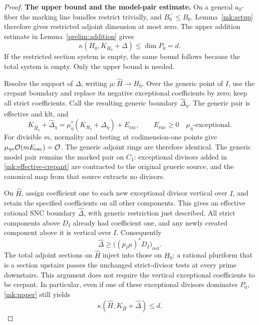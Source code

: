 \begin{proof}
\smallskip\noindent\textbf{The upper bound and the model-pair estimate.}\enspace
On a general $a_0$-fiber the marking line bundles restrict trivially,
and $B_0^-\leq B_0$.  Lemma~\ref{mk:setup} therefore gives restricted
adjoint dimension at most zero.  The upper addition estimate
in Lemma~\ref{prelim:addition} gives
\begin{equation}\label{mk:upper}
 \kappa(H_0,K_{H_0}+\Delta)\leq\dim P_0=d.
\end{equation}
If the restricted section system is empty, the same bound follows
because the total system is empty.  Only the upper bound is needed.

Resolve the support of $\Delta$, writing
$\mu:\widehat H\to H_0$.  Over the generic point of $I$, use the
crepant boundary and replace its negative exceptional coefficients by
zero; keep all strict coefficients.  Call the resulting generic
boundary $\widehat\Delta_\eta$.  The generic pair is effective and klt,
and
\begin{equation}\label{mk:effective-crepant}
 K_{\widehat H_\eta}+\widehat\Delta_\eta
 =\mu_\eta^*(K_{H_\eta}+\Delta_\eta)+E_{\mathrm{exc}},
 \qquad E_{\mathrm{exc}}\geq0
 \quad\text{$\mu_\eta$-exceptional}.
\end{equation}
For divisible $m$, normality and testing at codimension-one points give
$\mu_{\eta*}\mathcal O(mE_{\mathrm{exc}})=\mathcal O$.  The generic adjoint rings are
therefore identical.  The generic model pair remains the marked pair
on $C_1$: exceptional divisors added in \eqref{mk:effective-crepant}
are contracted to the original generic source, and the canonical map
from that source extracts no divisors.

On $\widehat H$, assign coefficient one to each new exceptional divisor
vertical over $I$, and retain the specified coefficients on all other
components.  This gives an effective rational SNC boundary
$\widehat\Delta$, with generic restriction just described.  All strict
components above $D_I$ already had coefficient one, and any newly
created component above it is vertical over $I$.  Consequently
\begin{equation}\label{mk:inverse-boundary}
 \widehat\Delta\geq
 \bigl((p_I\mu)^*D_I\bigr)_{\mathrm{red}}.
\end{equation}
The total adjoint sections on $\widehat H$ inject into those on $H_0$:
a rational pluriform that is a section upstairs passes the unchanged
strict-divisor tests at every prime downstairs.  This argument does not
require the vertical exceptional coefficients to be crepant.  In
particular, even if one of these exceptional divisors dominates $P_0$,
\eqref{mk:upper} still yields
\begin{equation}\label{mk:resolved-upper}
 \kappa(\widehat H,K_{\widehat H}+\widehat\Delta)\leq d.
\end{equation}


\end{proof}

